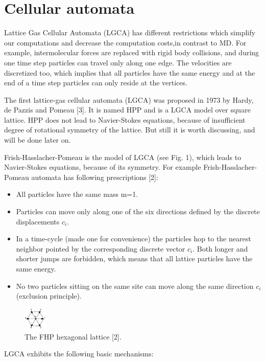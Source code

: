 
\section{Cellular automata}
Lattice Gas Cellular Automata (LGCA) has different restrictions which simplify our computations and decrease the computation costs,in contrast to MD. For example, intermolecular forces are replaced with rigid body collisions, and during one time step particles can travel only along one edge. The velocities are discretized too, which implies that all particles have the same energy and at the end of a time step particles can only reside at the vertices.

The first lattice-gas cellular automata (LGCA) was proposed in 1973 by Hardy, de Pazzis and Pomeau [3]. It is named HPP and is a LGCA model over square lattice. HPP does not lead to Navier-Stokes equations, because of insufficient degree of rotational symmetry of the lattice. But still it is worth  discussing, and  will be done later on.

Frish-Hasslacher-Pomeau is the model of LGCA (see Fig. 1), which leads to Navier-Stokes equations, because of its symmetry. For example Frish-Hasslacher-Pomeau automata has following prescriptions [2]:


\begin{itemize}
\item All particles have the same mass m=1.
\item Particles can move only along one of the six directions defined by the discrete displacements $c_{i}$.
\item In a time-cycle (made one for convenience) the particles hop to the nearest neighbor pointed by the corresponding discrete vector $c_i$. Both longer and shorter jumps are forbidden, which means that all lattice particles have the same energy.
\item No two particles sitting on the same site can move along the same direction $c_{i}$ (exclusion principle).
\end{itemize}

\begin{figure}[H]
  \centering
  \includegraphics[width=0.1\textwidth]{img/fig1.png}
  \caption{The FHP hexagonal lattice [2].}
\end{figure}

LGCA exhibits the following basic mechanisms:


